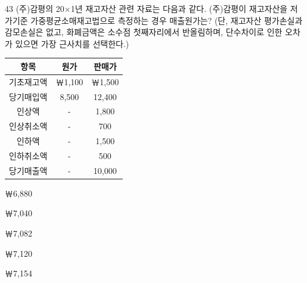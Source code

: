 \begin{question}{43}
(주)감평의 20×1년 재고자산 관련 자료는 다음과 같다. (주)감평이 재고자산을 저가기준 가중평균소매재고법으로 측정하는 경우 매출원가는? (단, 재고자산 평가손실과 감모손실은 없고, 화폐금액은 소수점 첫째자리에서 반올림하며, 단수차이로 인한 오차가 있으면 가장 근사치를 선택한다.)
\par{\small\centering
\begin{tabular}{|c|c|c|}\hline
항목 & 원가 & 판매가 \\ \hline
기초재고액 & ￦1,100 & ￦1,500 \\ \hline
당기매입액 & 8,500 & 12,400 \\ \hline
인상액 & - & 1,800 \\ \hline
인상취소액 & - & 700 \\ \hline
인하액 & - & 1,500 \\ \hline
인하취소액 & - & 500 \\ \hline
당기매출액 & - & 10,000 \\ \hline
\end{tabular}
\par}
\begin{choices}
  \item ￦6,880
  \item ￦7,040
  \item ￦7,082
  \item ￦7,120
  \item ￦7,154
\end{choices}
\end{question}
